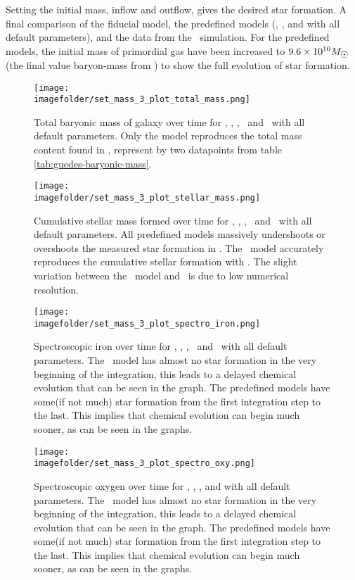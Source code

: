 Setting the initial mass, inflow and outflow, gives the desired star formation. A final comparison of the fiducial \omegamodel model, the predefined models (\mwomega, \mwcomega, and \omegamodel with all default parameters), and the data from the \eris\ simulation.
For the predefined models, the initial mass of primordial gas have been increased to $9.6\times10^{10}\msol$(the final value baryon-mass from \eris) to show the full evolution of star formation.

\begin{figure}[h]
  \centering
  \texttt{[image: \\imagefolder/set\_mass\_3\_plot\_total\_mass.png]}
  \caption{\label{fig:fit-v1-3-total}
    Total baryonic mass of galaxy over time for \eris, \fiduccialomega, \mwomega, \mwcomega\ and \omegamodel\ with all default parameters.
    Only the \fiduccialomega model reproduces the total mass content found in \eris, represent by two datapoints from table \ref{tab:guedes-baryonic-mass}.
  }
\end{figure}
\begin{figure}[h]
  \centering
  \texttt{[image: \\imagefolder/set\_mass\_3\_plot\_stellar\_mass.png]}
  \caption{\label{fig:fit-v1-3-stellar}
    Cumulative stellar mass formed over time for \eris, \mwomega, \mwcomega, \fiduccialomega\ and \omegamodel\ with all default parameters.
    All predefined models massively undershoots or overshoots the measured star formation in \eris.
    The \fiduccialomega\ model accurately reproduces the cumulative stellar formation with \eris. The slight variation between the \fiduccialomega\ model and \eris\ is due to low numerical resolution.
  }
\end{figure}
\begin{figure}[h]
  \centering
  \texttt{[image: \\imagefolder/set\_mass\_3\_plot\_spectro\_iron.png]}
  \caption{\label{fig:fit-v1-3-iron}
    Spectroscopic iron over time for \eris, \mwomega, \mwcomega, \fiduccialomega\ and \omegamodel\ with all default parameters.
    The \fiduccialomega\ model has almost no star formation in the very beginning of the integration, this leads to a delayed chemical evolution that can be seen in the graph. The predefined models have some(if not much) star formation from the first integration step to the last. This implies that chemical evolution can begin much sooner, as can be seen in the graphs.
  }
\end{figure}
\begin{figure}[h]
  \centering
  \texttt{[image: \\imagefolder/set\_mass\_3\_plot\_spectro\_oxy.png]}
  \caption{\label{fig:fit-v1-3-oxy}
    Spectroscopic oxygen over time for \eris, \mwomega, \mwcomega, \fiduccialomega and \omegamodel with all default parameters.
    The \fiduccialomega\ model has almost no star formation in the very beginning of the integration, this leads to a delayed chemical evolution that can be seen in the graph. The predefined models have some(if not much) star formation from the first integration step to the last. This implies that chemical evolution can begin much sooner, as can be seen in the graphs.
  }
\end{figure}

